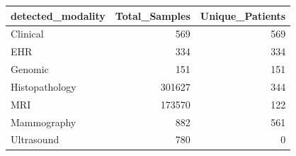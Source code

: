 \begin{tabular}{lrr}
\toprule
detected\_modality & Total\_Samples & Unique\_Patients \\
\midrule
Clinical & 569 & 569 \\
EHR & 334 & 334 \\
Genomic & 151 & 151 \\
Histopathology & 301627 & 344 \\
MRI & 173570 & 122 \\
Mammography & 882 & 561 \\
Ultrasound & 780 & 0 \\
\bottomrule
\end{tabular}
